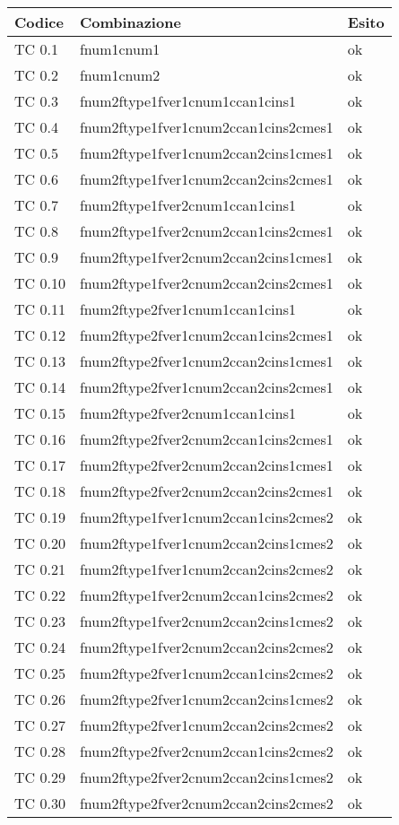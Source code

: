 \vspace{1cm}

\begin{tabular}{|p{3cm}|p{7cm}|p{3cm}|}
	\hline
	\rowcolor{Gray}
	\textbf{Codice} & \textbf{Combinazione} & \textbf{Esito}\tabularnewline
	\hline
	TC 0.1			& fnum1cnum1					& ok \tabularnewline
	\hline
	TC 0.2			& fnum1cnum2					& ok \tabularnewline
	\hline
	TC 0.3			& fnum2ftype1fver1cnum1ccan1cins1		& ok \tabularnewline
	\hline
	TC 0.4			& fnum2ftype1fver1cnum2ccan1cins2cmes1		& ok \tabularnewline
	\hline
	TC 0.5			& fnum2ftype1fver1cnum2ccan2cins1cmes1		& ok \tabularnewline
	\hline
	TC 0.6			& fnum2ftype1fver1cnum2ccan2cins2cmes1		& ok \tabularnewline
	\hline
	TC 0.7			& fnum2ftype1fver2cnum1ccan1cins1		& ok \tabularnewline
	\hline
	TC 0.8			& fnum2ftype1fver2cnum2ccan1cins2cmes1		& ok \tabularnewline
	\hline
	TC 0.9			& fnum2ftype1fver2cnum2ccan2cins1cmes1		& ok \tabularnewline
	\hline
	TC 0.10			& fnum2ftype1fver2cnum2ccan2cins2cmes1		& ok \tabularnewline
	\hline
	TC 0.11			& fnum2ftype2fver1cnum1ccan1cins1		& ok \tabularnewline
	\hline
	TC 0.12			& fnum2ftype2fver1cnum2ccan1cins2cmes1		& ok \tabularnewline
	\hline
	TC 0.13			& fnum2ftype2fver1cnum2ccan2cins1cmes1		& ok \tabularnewline
	\hline
	TC 0.14			& fnum2ftype2fver1cnum2ccan2cins2cmes1		& ok \tabularnewline
	\hline
	TC 0.15			& fnum2ftype2fver2cnum1ccan1cins1		& ok \tabularnewline
	\hline
	TC 0.16			& fnum2ftype2fver2cnum2ccan1cins2cmes1		& ok \tabularnewline
	\hline
	TC 0.17			& fnum2ftype2fver2cnum2ccan2cins1cmes1		& ok \tabularnewline
	\hline
	TC 0.18			& fnum2ftype2fver2cnum2ccan2cins2cmes1		& ok \tabularnewline
	\hline
	TC 0.19			& fnum2ftype1fver1cnum2ccan1cins2cmes2		& ok \tabularnewline
	\hline
	TC 0.20			& fnum2ftype1fver1cnum2ccan2cins1cmes2		& ok \tabularnewline
	\hline
	TC 0.21			& fnum2ftype1fver1cnum2ccan2cins2cmes2		& ok \tabularnewline
	\hline
	TC 0.22			& fnum2ftype1fver2cnum2ccan1cins2cmes2		& ok \tabularnewline
	\hline
	TC 0.23			& fnum2ftype1fver2cnum2ccan2cins1cmes2		& ok \tabularnewline
	\hline
	TC 0.24			& fnum2ftype1fver2cnum2ccan2cins2cmes2		& ok \tabularnewline
	\hline
	TC 0.25			& fnum2ftype2fver1cnum2ccan1cins2cmes2		& ok \tabularnewline
	\hline
	TC 0.26			& fnum2ftype2fver1cnum2ccan2cins1cmes2		& ok \tabularnewline
	\hline
	TC 0.27			& fnum2ftype2fver1cnum2ccan2cins2cmes2		& ok \tabularnewline
	\hline
	TC 0.28			& fnum2ftype2fver2cnum2ccan1cins2cmes2		& ok \tabularnewline
	\hline
	TC 0.29			& fnum2ftype2fver2cnum2ccan2cins1cmes2		& ok \tabularnewline
	\hline
	TC 0.30			& fnum2ftype2fver2cnum2ccan2cins2cmes2		& ok \tabularnewline
	\hline
\end{tabular}
\clearpage




